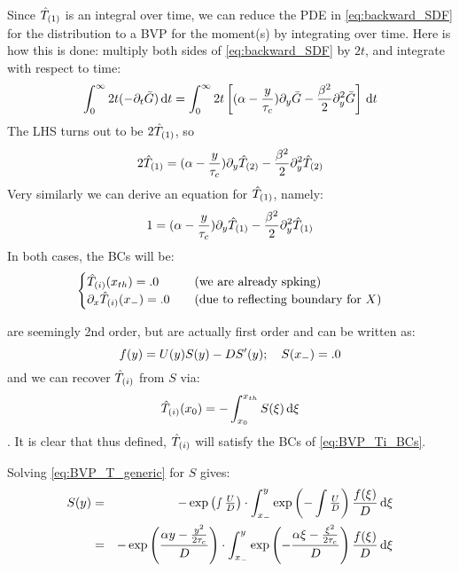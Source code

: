 \documentclass{article}
\begin{document}
Since ${ \hat{T}_{(1)} }$ is an integral over time, we can reduce the PDE in
\cref{eq:backward_SDF} for the distribution to a BVP for the moment(s) by
integrating over time. Here is how this is done: multiply both sides  of
\cref{eq:backward_SDF} by $2t$, and integrate with respect to time:
\begin{equation}
\int_0^\infty 2t (-{\partial}_t { \bar{G} }) \, \mathrm{d} t
= 
\int_0^\infty  2t \left[ ({\alpha} - \frac y{{ \tau_{c} }}) {\partial}_y{ \bar{G} } - \frac {{\beta}^2} 2
{\partial}_y^2 { \bar{G} }\right]
\, \mathrm{d} t
\end{equation}
The LHS turns out to be $2{ \hat{T}_{(1)} }$, so 
\begin{equation}
2{ \hat{T}_{(1)} }
=({\alpha} - \frac y{{ \tau_{c} }})   {\partial}_y { \hat{T}_{(2)} } 
- \frac {{\beta}^2} 2
{\partial}_y^2 { \hat{T}_{(2)} }
\label{eq:BVP_Ttwo}
\end{equation}
Very similarly we can derive an equation for ${ \hat{T}_{(1)} }$, namely:
\begin{equation}
1
=({\alpha} - \frac y{{ \tau_{c} }})   {\partial}_y { \hat{T}_{(1)} } 
- \frac {{\beta}^2} 2
{\partial}_y^2 { \hat{T}_{(1)} }
\label{eq:BVP_Tone}
\end{equation}
In both cases, the BCs will be:
\begin{equation}
\begin{cases}
{ \hat{T}_{(i)} }({ x_{th} }) = .0 & \quad (\textrm{we are already spking})
\\
{\partial}_x { \hat{T}_{(i)} }({ x_{-} }) = .0  & \quad (\textrm{due to reflecting boundary for }X)
\end{cases}
\label{eq:BVP_Ti_BCs}
\end{equation}

 are seemingly 2nd order, but are actually
first order and can be written as:
\begin{equation}
f(y)
=U(y) S(y) 
- D S'(y) ; \quad  S({ x_{-} }) = .0
\label{eq:BVP_T_generic}
\end{equation}
and we can recover ${ \hat{T}_{(i)} }$ from $S$ via:
$${ \hat{T}_{(i)} }(x_0) =   -\int_{x_0}^{ x_{th} } S(\xi)\, \mathrm{d} \xi$$.
It is clear that thus defined, ${ \hat{T}_{(i)} }$ will satisfy the BCs of
\cref{eq:BVP_Ti_BCs}.

Solving \cref{eq:BVP_T_generic} for $S$ gives:
\begin{eqnarray}
S(y) &=& - \exp\left(\smallint \tfrac UD \right) \cdot \int_{ x_{-} }^{y} 
\exp\left(-\int \tfrac UD\right) \frac{f(\xi)}D
\, \mathrm{d} \xi
\\
 &=& - \exp\left( \frac{{\alpha} y - \frac{y^2}{2{ \tau_{c} }}}D \right) 
 		\cdot 
 		\int_{ x_{-} }^{y}   \exp\left(- \frac{{\alpha} \xi - \tfrac{\xi^2}{2{ \tau_{c} }}}D \right)
 		\frac{f(\xi)}D \, \mathrm{d} \xi
\label{eq:BVP_T_generic_soln}
\end{eqnarray}
\end{document}

